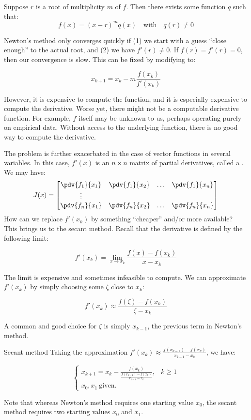 Suppose $r$ is a root of multiplicity $m$ of $f$. Then there exists some function $q$ such that:
\[ f(x) = (x - r)^m q(x) \quad \text{with} \quad q(r) \neq 0 \]

Newton's method only converges quickly if (1) we start with a guess ``close enough'' to the actual root, and (2) we have $f\prime(r) \neq 0$. If $f(r) = f\prime(r) = 0$, then our convergence is slow. This can be fixed by modifying to:

\[ x_{k+1} = x_k - m \frac{f(x_k)}{f\prime(x_k)} \]

However, it is expensive to compute the function, and it is especially expensive to compute the derivative. Worse yet, there might not be a computable derivative function. For example, $f$ itself may be unknown to us, perhaps operating purely on empirical data. Without access to the underlying function, there is no good way to compute the derivative.

The problem is further exacerbated in the case of vector functions in several variables. In this case, $f\prime(x)$ is an $n \times n$ matrix of partial derivatives, called a . We may have:
\begin{align*}
    J(x) = \begin{bmatrix}
        \pdv{f_1}{x_1} & \pdv{f_1}{x_2} & \ldots & \pdv{f_1}{x_n} \\
        \vdots \\
        \pdv{f_n}{x_1} & \pdv{f_n}{x_2} & \ldots & \pdv{f_n}{x_n}
    \end{bmatrix}
\end{align*}
How can we replace $f\prime(x_k)$ by something ``cheaper'' and/or more available? This brings us to the secant method. Recall that the derivative is defined by the following limit:

\[ f\prime(x_k) = \lim_{x \to x_k} \frac{f(x) - f(x_k)}{x - x_k} \]

The limit is expensive and sometimes infeasible to compute. We can approximate $f\prime(x_k)$ by simply choosing some $\zeta$ close to $x_k$:

\[ f\prime(x_k) \approx \frac{f(\zeta) - f(x_k)}{\zeta - x_k} \]

A common and good choice for $\zeta$ is simply $x_{k-1}$, the previous term in Newton's method.

\begin{tecbox}{Secant method}{}
    Taking the approximation $ f\prime(x_k) \approx \frac{f(x_{k-1}) - f(x_k)}{x_{k-1} - x_k}$, we have:

    \[ \begin{cases}
        x_{k+1} = x_k - \frac{f(x_k)}{\frac{f(x_{k-1}) - f(x_k)}{x_{k-1} - x_k}}, & k \geq 1 \\
        x_0, x_1\ \text{given.}
    \end{cases}\]

    Note that whereas Newton's method requires one starting value $x_0$, the secant method requires two starting values $x_0$ and $x_1$.
\end{tecbox}

